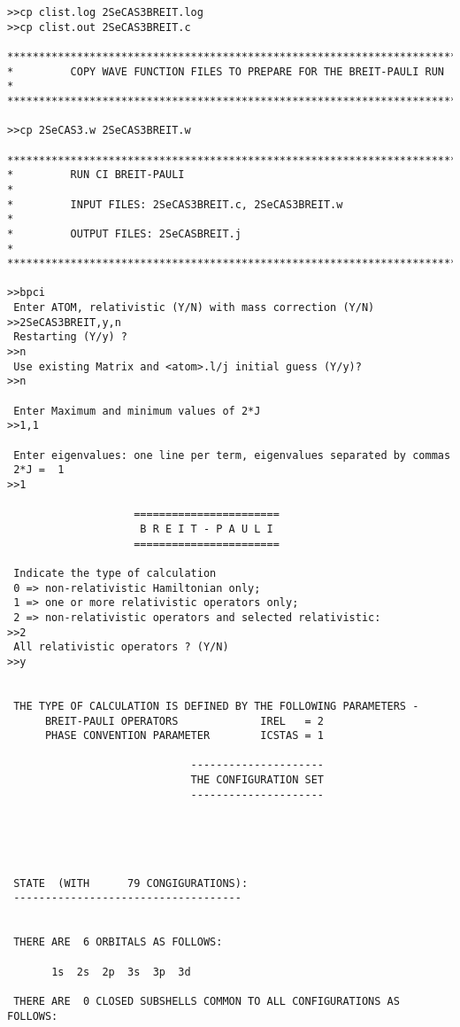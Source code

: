 \documentclass[fleqn,10pt]{book}
\begin{document}
\begin{verbatim}
>>cp clist.log 2SeCAS3BREIT.log
>>cp clist.out 2SeCAS3BREIT.c

*******************************************************************************
*         COPY WAVE FUNCTION FILES TO PREPARE FOR THE BREIT-PAULI RUN         *
*******************************************************************************

>>cp 2SeCAS3.w 2SeCAS3BREIT.w

*******************************************************************************
*         RUN CI BREIT-PAULI                                                  *
*         INPUT FILES: 2SeCAS3BREIT.c, 2SeCAS3BREIT.w                         *
*         OUTPUT FILES: 2SeCASBREIT.j                                         *
*******************************************************************************

>>bpci
 Enter ATOM, relativistic (Y/N) with mass correction (Y/N)
>>2SeCAS3BREIT,y,n
 Restarting (Y/y) ?
>>n
 Use existing Matrix and <atom>.l/j initial guess (Y/y)?
>>n

 Enter Maximum and minimum values of 2*J
>>1,1

 Enter eigenvalues: one line per term, eigenvalues separated by commas
 2*J =  1
>>1

                    =======================
                     B R E I T - P A U L I
                    =======================

 Indicate the type of calculation
 0 => non-relativistic Hamiltonian only;
 1 => one or more relativistic operators only;
 2 => non-relativistic operators and selected relativistic:
>>2
 All relativistic operators ? (Y/N)
>>y


 THE TYPE OF CALCULATION IS DEFINED BY THE FOLLOWING PARAMETERS -
      BREIT-PAULI OPERATORS             IREL   = 2
      PHASE CONVENTION PARAMETER        ICSTAS = 1

                             ---------------------
                             THE CONFIGURATION SET
                             ---------------------





 STATE  (WITH      79 CONGIGURATIONS):
 ------------------------------------


 THERE ARE  6 ORBITALS AS FOLLOWS:

       1s  2s  2p  3s  3p  3d

 THERE ARE  0 CLOSED SUBSHELLS COMMON TO ALL CONFIGURATIONS AS FOLLOWS:



\end{verbatim}
\end{document}
